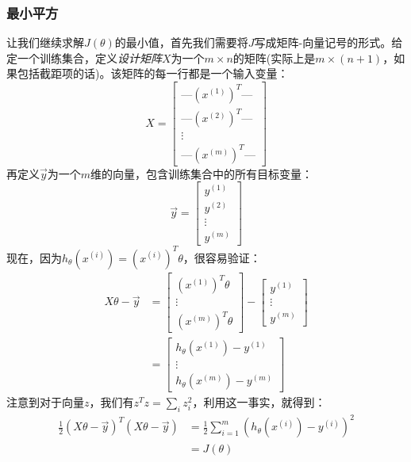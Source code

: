 \subsubsection{最小平方}
让我们继续求解$J(\theta)$的最小值，首先我们需要将$J$写成矩阵-向量记号的形式。给定一个训练集合，定义\emph{设计矩阵}$X$为一个$m \times n$的矩阵(实际上是$m \times (n + 1)$，如果包括截距项的话)。该矩阵的每一行都是一个输入变量：
\begin{equation*}
X =
\begin{bmatrix}
\text{---} (x^{(1)})^T \text{---} \\
\text{---} (x^{(2)})^T \text{---} \\
\vdots \\
\text{---} (x^{(m)})^T \text{---}
\end{bmatrix}
\end{equation*}
再定义$\vec{y}$为一个$m$维的向量，包含训练集合中的所有目标变量：
\begin{equation*}
\vec{y} =
\begin{bmatrix}
y^{(1)} \\
y^{(2)} \\
\vdots \\
y^{(m)}
\end{bmatrix}
\end{equation*}
现在，因为$h_\theta(x^{(i)}) = (x^{(i)})^T\theta$，很容易验证：
\begin{equation*}
\begin{split}
X\theta - \vec{y} &=
\begin{bmatrix}
(x^{(1)})^T\theta \\
\vdots \\
(x^{(m)})^T\theta
\end{bmatrix}
-
\begin{bmatrix}
y^{(1)} \\
\vdots \\
y^{(m)}
\end{bmatrix} \\
&=
\begin{bmatrix}
h_\theta(x^{(1)}) - y^{(1)} \\
\vdots \\
h_\theta(x^{(m)}) - y^{(m)} 
\end{bmatrix}
\end{split}
\end{equation*}
注意到对于向量$z$，我们有$z^Tz = \sum_iz^2_i$，利用这一事实，就得到：
\begin{equation*}
\begin{split}
\frac{1}{2}(X\theta - \vec{y})^T(X\theta - \vec{y}) &= \frac{1}{2}\sum_{i = 1}^m(h_\theta(x^{(i)}) - y^{(i)})^2 \\
&= J(\theta)
\end{split}
\end{equation*}
